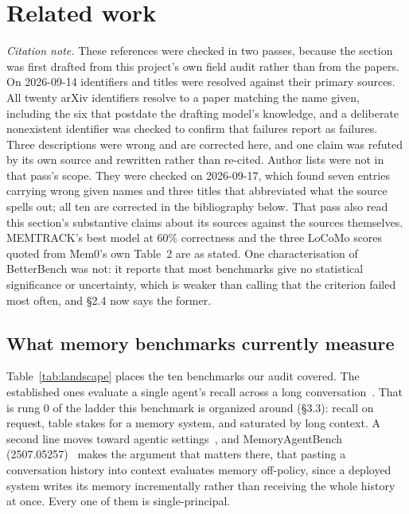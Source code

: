 \documentclass[11pt]{article}
\begin{document}
\section{Related work}

\noindent\textit{Citation note.} These references were checked in two passes,
because the section was first drafted from this project's own field audit rather
than from the papers. On 2026-09-14 identifiers and titles were resolved against
their primary sources. All twenty arXiv identifiers resolve to a paper matching
the name given, including the six that postdate the drafting model's knowledge,
and a deliberate nonexistent identifier was checked to confirm that failures
report as failures. Three descriptions were wrong and are corrected here, and one
claim was refuted by its own source and rewritten rather than re-cited. Author
lists were not in that pass's scope. They were checked on 2026-09-17, which found
seven entries carrying wrong given names and three titles that abbreviated what
the source spells out; all ten are corrected in the bibliography below. That pass
also read this section's substantive claims about its sources against the sources
themselves. MEMTRACK's best model at 60\% correctness and the three LoCoMo scores
quoted from Mem0's own Table~2 are as stated. One characterisation of BetterBench
was not: it reports that most benchmarks give no statistical significance or
uncertainty, which is weaker than calling that the criterion failed most often,
and \S2.4 now says the former.

\subsection{What memory benchmarks currently measure}

Table~\ref{tab:landscape} places the ten benchmarks our audit covered. The
established ones evaluate a single agent's recall across a long
conversation~\cite{locomo,longmemeval,membench}.
That is rung 0 of the ladder this benchmark is organized around (\S3.3): recall
on request, table stakes for a memory system, and saturated by long context. A
second line moves toward agentic
settings~\cite{memoryarena,streammembench,horizonbench,longmemeval2}, and
MemoryAgentBench (2507.05257)~\cite{memoryagentbench} makes the argument that matters there, that pasting a conversation history into
context evaluates memory off-policy, since a deployed system writes its memory
incrementally rather than receiving the whole history at once. Every one of them
is single-principal.
\end{document}

